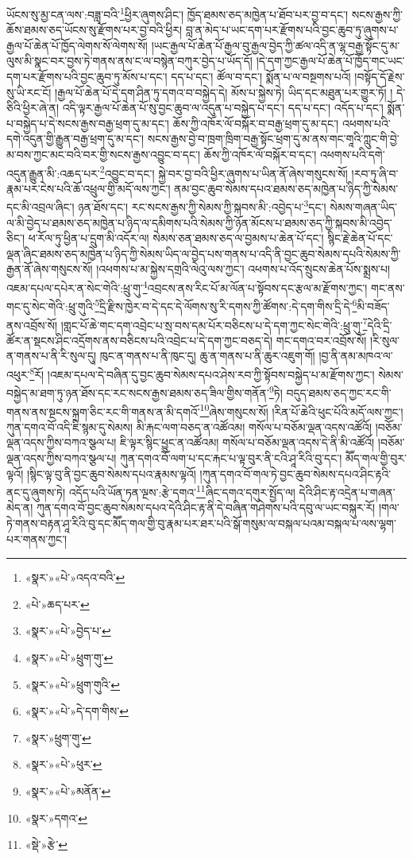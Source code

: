 ཡོངས་སུ་མྱ་ངན་ལས་:བཟླ་བའི་\footnote{«སྣར་»«པེ་»འདའ་བའི་}ཕྱིར་ཞུགས་ཤིང་། ཁྱོད་ཐམས་ཅད་མཁྱེན་པ་ཐོབ་པར་བྱ་བ་དང་། སངས་རྒྱས་ཀྱི་ཆོས་ཐམས་ཅད་ཡོངས་སུ་རྫོགས་པར་བྱ་བའི་ཕྱིར། བླ་ན་མེད་པ་ཡང་དག་པར་རྫོགས་པའི་བྱང་ཆུབ་ཏུ་ཞུགས་པ་རྒྱལ་པོ་ཆེན་པོ་ཁྱོད་ལེགས་སོ་ལེགས་སོ། །ཡང་རྒྱལ་པོ་ཆེན་པོ་རྒྱལ་བུ་རྒྱལ་བྱེད་ཀྱི་ཚལ་འདི་ན་ལྷ་བརྒྱ་སྟོང་དུ་མ་ལུས་མི་སྣང་བར་བྱས་ཏེ་གནས་ནས་ང་ལ་བསྙེན་བཀུར་བྱེད་པ་ཡོད་དོ། །དེ་དག་ཀྱང་རྒྱལ་པོ་ཆེན་པོ་ཁྱོད་གང་ཡང་དག་པར་རྫོགས་པའི་བྱང་ཆུབ་ཏུ་མོས་པ་དང་། དད་པ་དང་། ཚོལ་བ་དང་། སྨོན་པ་ལ་བསྔགས་པའོ། །བསྟོད་དོ་རྗེས་སུ་ཡི་རང་ངོ། །རྒྱལ་པོ་ཆེན་པོ་དེ་དག་ཤིན་ཏུ་དགའ་བ་བསྐྱེད་དེ། མོས་པ་སྐྱེས་ཏེ། ཡིད་དང་མཐུན་པར་གྱུར་ཏོ། །
དེ་ཅིའི་ཕྱིར་ཞེ་ན། འདི་ལྟར་རྒྱལ་པོ་ཆེན་པོ་སུ་བྱང་ཆུབ་ལ་འདུན་པ་བསྐྱེད་པ་དང་། དད་པ་དང་། འདོད་པ་དང་། སྨོན་པ་བསྐྱེད་པ་དེ་སངས་རྒྱས་བརྒྱ་ཕྲག་དུ་མ་དང་། ཆོས་ཀྱི་འཁོར་ལོ་བསྐོར་བ་བརྒྱ་ཕྲག་དུ་མ་དང་། འཕགས་པའི་དགེ་འདུན་གྱི་རྒྱུན་བརྒྱ་ཕྲག་དུ་མ་དང་། སངས་རྒྱས་བྱེ་བ་ཁྲག་ཁྲིག་བརྒྱ་སྟོང་ཕྲག་དུ་མ་ནས་གང་གཱའི་ཀླུང་གི་བྱེ་མ་བས་ཀྱང་མང་བའི་བར་གྱི་སངས་རྒྱས་འབྱུང་བ་དང་། ཆོས་ཀྱི་འཁོར་ལོ་བསྐོར་བ་དང་། འཕགས་པའི་དགེ་འདུན་རྒྱུན་མི་:འཆད་པར་\footnote{«པེ་»ཆད་པར་}འབྱུང་བ་དང་། སྐྱེ་བར་བྱ་བའི་ཕྱིར་ཞུགས་པ་ཡིན་ནོ་ཞེས་གསུངས་སོ། །རབ་ཏུ་ཞི་བ་རྣམ་པར་ངེས་པའི་ཆོ་འཕྲུལ་གྱི་མདོ་ལས་ཀྱང་། ནམ་བྱང་ཆུབ་སེམས་དཔའ་ཐམས་ཅད་མཁྱེན་པ་ཉིད་ཀྱི་སེམས་དང་མི་འབྲལ་ཞིང་། ཉན་ཐོས་དང་། རང་སངས་རྒྱས་ཀྱི་སེམས་ཀྱི་སྐབས་མི་:འབྱེད་པ་\footnote{«སྣར་»«པེ་»བྱེད་པ་}དང་། སེམས་གཞན་ཡིད་ལ་མི་བྱེད་པ་ཐམས་ཅད་མཁྱེན་པ་ཉིད་ལ་དམིགས་པའི་སེམས་ཀྱི་ཉོན་མོངས་པ་ཐམས་ཅད་ཀྱི་སྐབས་མི་འབྱེད་ཅིང་། ཕ་རོལ་ཏུ་ཕྱིན་པ་དྲུག་མི་འདོར་ལ། སེམས་ཅན་ཐམས་ཅད་ལ་བྱམས་པ་ཆེན་པོ་དང་། སྙིང་རྗེ་ཆེན་པོ་དང་ལྡན་ཞིང་ཐམས་ཅད་མཁྱེན་པ་ཉིད་ཀྱི་སེམས་ཡིད་ལ་བྱེད་པས་གནས་པ་འདི་ནི་བྱང་ཆུབ་སེམས་དཔའི་སེམས་ཀྱི་རྒྱན་ནོ་ཞེས་གསུངས་སོ། །འཕགས་པ་མ་སྐྱེས་དགྲའི་ལེའུ་ལས་ཀྱང་། འཕགས་པ་འོད་སྲུངས་ཆེན་པོས་སྨྲས་པ། འཇམ་དཔལ་དཔེར་ན་སེང་གེའི་:ཕྲུ་གུ་\footnote{«སྣར་»«པེ་»ཕྲུག་གུ་}འབྲངས་ནས་རིང་པོ་མ་ལོན་པ་སྟོབས་དང་རྩལ་མ་རྫོགས་ཀྱང་། གང་ནས་གང་དུ་སེང་གེའི་:ཕྲུ་གུའི་\footnote{«སྣར་»«པེ་»ཕྲུག་གུའི་}དྲི་རྫིས་ཁྱེར་བ་དེ་དང་དེ་ལོགས་སུ་རི་དགས་ཀྱི་ཚོགས་:དེ་དག་གིས་དྲི་དེ་\footnote{«སྣར་»«པེ་»དེ་དག་གིས་}མི་བཟོད་ནས་འབྲོས་སོ། །གླང་པོ་ཆེ་གང་དག་འབྲེང་པ་སྲ་བས་དམ་པོར་བཅིངས་པ་དེ་དག་ཀྱང་སེང་གེའི་:ཕྲུ་གུ་\footnote{«སྣར་»ཕྲུག་གུ་}དེའི་དྲི་ཚོར་ན་སྡངས་ཤིང་འདྲོགས་ནས་བཅིངས་པའི་འབྲེང་པ་དེ་དག་ཀྱང་བཅད་དེ། གང་དགའ་བར་འབྲོས་སོ། །རི་སུལ་ན་གནས་པ་ནི་རི་སུལ་དུ། ཁུང་ན་གནས་པ་ནི་ཁུང་དུ། ཆུ་ན་གནས་པ་ནི་ཆུར་འཇུག་གོ། །བྱ་ནི་ནམ་མཁའ་ལ་འཕུར་\footnote{«སྣར་»«པེ་»ཕུར་}རོ། །འཇམ་དཔལ་དེ་བཞིན་དུ་བྱང་ཆུབ་སེམས་དཔའ་ཤེས་རབ་ཀྱི་སྟོབས་བསྐྱེད་པ་མ་རྫོགས་ཀྱང་། སེམས་བསྐྱེད་མ་ཐག་ཏུ་ཉན་ཐོས་དང་རང་སངས་རྒྱས་ཐམས་ཅད་ཟིལ་གྱིས་གནོན་\footnote{«སྣར་»«པེ་»མནོན་}ཏེ། བདུད་ཐམས་ཅད་ཀྱང་རང་གི་གནས་ནས་སྔངས་སྐྲག་ཅིང་རང་གི་གནས་ན་མི་དགའོ་\footnote{«སྣར་»དགའ་}ཞེས་གསུངས་སོ། །རིན་པོ་ཆེའི་ཕུང་པོའི་མདོ་ལས་ཀྱང་། ཀུན་དགའ་བོ་འདི་ཇི་སྙམ་དུ་སེམས། མི་རྐང་ལག་བཅད་ན་འཚོའམ། གསོལ་པ་བཅོམ་ལྡན་འདས་འཚོའོ། །བཅོམ་ལྡན་འདས་ཀྱིས་བཀའ་སྩལ་པ། ཇི་ལྟར་སྙིང་ཕྱུང་ན་འཚོའམ། གསོལ་པ་བཅོམ་ལྡན་འདས་དེ་ནི་མི་འཚོའོ། །བཅོམ་ལྡན་འདས་ཀྱིས་བཀའ་སྩལ་པ། ཀུན་དགའ་བོ་ལག་པ་དང་རྐང་པ་ལྟ་བུར་ནི་ངའི་ཤཱ་རིའི་བུ་དང་། མཽད་གལ་གྱི་བུར་ལྟའོ། །སྙིང་ལྟ་བུ་ནི་བྱང་ཆུབ་སེམས་དཔའ་རྣམས་ལྟའོ། །ཀུན་དགའ་བོ་གལ་ཏེ་བྱང་ཆུབ་སེམས་དཔའ་ཤིང་རྟའི་ནང་དུ་ཞུགས་ཏེ། འདོད་པའི་ཡོན་ཏན་ལྔས་:རྩེ་དགའ་\footnote{«སྡེ་»རྩེ་}ཞིང་དགའ་དགུར་སྤྱོད་ལ། དེའི་ཤིང་རྟ་འདྲེན་པ་གཞན་མེད་ན། ཀུན་དགའ་བོ་བྱང་ཆུབ་སེམས་དཔའ་དེའི་ཤིང་རྟ་ནི་དེ་བཞིན་གཤེགས་པའི་དབུ་ལ་ཡང་བསྐུར་རོ། །གལ་ཏེ་གནས་བརྟན་ཤཱ་རིའི་བུ་དང་མཽད་གལ་གྱི་བུ་རྣམ་པར་ཐར་པའི་སྒོ་གསུམ་ལ་བསྐལ་པའམ་བསྐལ་པ་ལས་ལྷག་པར་གནས་ཀྱང་། 